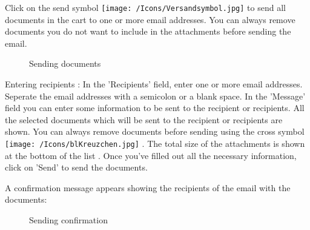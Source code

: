 Click on the send symbol \texttt{[image: /Icons/Versandsymbol.jpg]} to send all documents in the cart to one or more email addresses. You can always remove documents you do not want to include in the attachments before sending the email.

\begin{figure}[H]
\caption{Sending documents}
\end{figure}

Entering recipients : In the 'Recipients' field, enter one or more email addresses. Seperate the email addresses with a semicolon or a blank space.
In the 'Message' field  you can enter some information to be sent to the recipient or recipients. All the selected documents which will be sent to the recipient or recipients are shown. You can always remove documents before sending using the cross symbol \texttt{[image: /Icons/blKreuzchen.jpg]} . The total size of the attachments is shown at the bottom of the list . Once you've filled out all the necessary information, click on 'Send'  to send the documents.

\vspace{\baselineskip}

A confirmation message appears showing the recipients of the email with the documents:

\begin{figure}[H]
\caption{Sending confirmation}
\end{figure}

